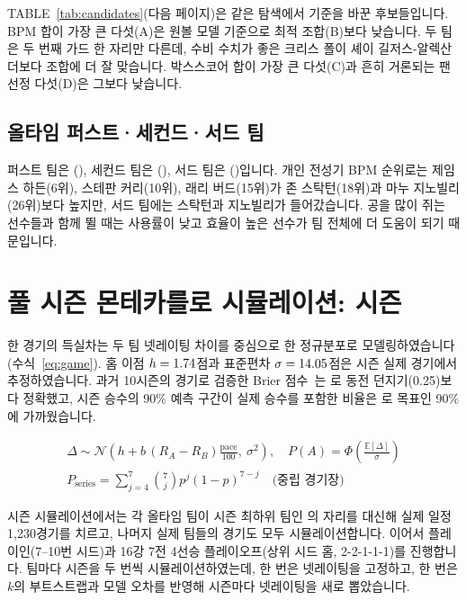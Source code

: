 \documentclass[conference,a4paper]{IEEEtran}
\begin{document}
TABLE~\ref{tab:candidates}(다음 페이지)은 같은 탐색에서 기준을 바꾼 후보들입니다. BPM 합이 가장 큰 다섯(A)은 원볼 모델 기준으로 최적 조합(B)보다 낮습니다. 두 팀은 두 번째 가드 한 자리만 다른데, 수비 수치가 좋은 크리스 폴이 셰이 길저스-알렉산더보다 조합에 더 잘 맞습니다. 박스스코어 합이 가장 큰 다섯(C)과 흔히 거론되는 팬 선정 다섯(D)은 그보다 낮습니다.



\subsection{\colorbox{yellow!40}{\textbf{올타임 퍼스트·세컨드·서드 팀}}}
\noindent\colorbox{yellow!40}{\parbox{\dimexpr\linewidth-2\fboxsep\relax}{%
퍼스트 팀은 \FirstTeamNames{}(\FirstTeamRating{}), 세컨드 팀은 \SecondTeamNames{}(\SecondTeamRating{}), 서드 팀은 \ThirdTeamNames{}(\ThirdTeamRating{})입니다. 개인 전성기 BPM 순위로는 제임스 하든(6위), 스테판 커리(10위), 래리 버드(15위)가 존 스탁턴(18위)과 마누 지노빌리(26위)보다 높지만, 서드 팀에는 스탁턴과 지노빌리가 들어갔습니다. 공을 많이 쥐는 선수들과 함께 뛸 때는 사용률이 낮고 효율이 높은 선수가 팀 전체에 더 도움이 되기 때문입니다.}}

\section{풀 시즌 몬테카를로 시뮬레이션: \LastSeason{} 시즌}\label{sec:mc}
한 경기의 득실차는 두 팀 넷레이팅 차이를 중심으로 한 정규분포로 모델링하였습니다(수식~\eqref{eq:game}). 홈 이점 $h=1.74{}$점과 표준편차 $\sigma=14.05{}$점은 \LastSeason{} 시즌 실제 경기에서 추정하였습니다. 과거 10시즌의 경기로 검증한 Brier 점수~\cite{brier}는 \BrierTest{}로 동전 던지기(0.25)보다 정확했고, 시즌 승수의 90\% 예측 구간이 실제 승수를 포함한 비율은 \Coverage{}로 목표인 90\%에 가까웠습니다.

\begin{gather}
\Delta \sim \mathcal{N}\!\left(h + b\,(R_A - R_B)\tfrac{\text{pace}}{100},\ \sigma^2\right), \quad
P(A) = \Phi\!\left(\tfrac{\mathbb{E}[\Delta]}{\sigma}\right) \label{eq:game}\\
P_{\text{series}} = \sum_{j=4}^{7} \binom{7}{j} p^{j}(1-p)^{7-j} \quad \text{(중립 경기장)} \label{eq:series}
\end{gather}

시즌 시뮬레이션에서는 각 올타임 팀이 \LastSeason{} 시즌 최하위 팀인 \ReplacedTeam{}의 자리를 대신해 실제 일정 1{,}230경기를 치르고, 나머지 실제 팀들의 경기도 모두 시뮬레이션합니다. 이어서 플레이인(7--10번 시드)과 16강 7전 4선승 플레이오프(상위 시드 홈, 2-2-1-1-1)를 진행합니다. 팀마다 \NSims{}시즌을 두 번씩 시뮬레이션하였는데, 한 번은 넷레이팅을 고정하고, 한 번은 $k$의 부트스트랩과 모델 오차를 반영해 시즌마다 넷레이팅을 새로 뽑았습니다.\\
\end{document}
